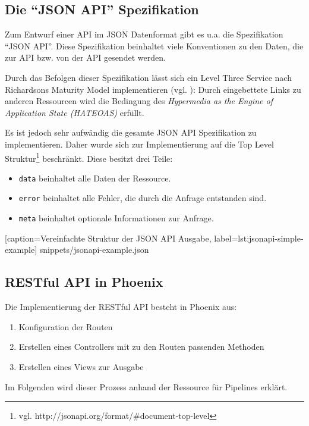 \subsection{Die ``JSON API'' Spezifikation}
\label{subsec:jsonapi}

Zum Entwurf einer API im JSON Datenformat gibt es u.a. die Spezifikation ``JSON API''. Diese Spezifikation beinhaltet viele Konventionen zu den Daten, die zur API bzw. von der API gesendet werden.

Durch das Befolgen dieser Spezifikation lässt sich ein Level Three Service nach Richardsons Maturity Model implementieren (vgl. \citep[20]{Webber2010}): Durch eingebettete Links zu anderen Ressourcen wird die Bedingung des \emph{Hypermedia as the Engine of Application State (HATEOAS)} erfüllt.

Es ist jedoch sehr aufwändig die gesamte JSON API Spezifikation zu implementieren. Daher wurde sich zur Implementierung auf die Top Level Struktur\footnote{vgl. http://jsonapi.org/format/\#document-top-level} beschränkt. Diese besitzt drei Teile:

\begin{itemize}
  \item \texttt{data} beinhaltet alle Daten der Ressource.
  \item \texttt{error} beinhaltet alle Fehler, die durch die Anfrage entstanden sind.
  \item \texttt{meta} beinhaltet optionale Informationen zur Anfrage.
\end{itemize}


  [caption={Vereinfachte Struktur der JSON API Ausgabe},
  label={lst:jsonapi-simple-example}]
  {snippets/jsonapi-example.json}

\subsection{RESTful API in Phoenix}

Die Implementierung der RESTful API besteht in Phoenix aus:

\begin{enumerate}
  \item Konfiguration der Routen
  \item Erstellen eines Controllers mit zu den Routen passenden Methoden
  \item Erstellen eines Views zur Ausgabe
\end{enumerate}

Im Folgenden wird dieser Prozess anhand der Ressource für Pipelines erklärt.

